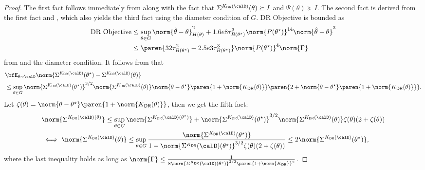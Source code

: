 \begin{proof}
    The first fact follows immediately from  along with the fact that $\Sigma^{K_{\mathsf{DR}}(\calD)}(\theta) \succeq I$ and $\Psi(\theta) \succeq I$. The second fact is derived from the first fact and , which also yields the third fact using the diameter condition of $G$. 
    DR Objective is bounded as
    \begin{align*}
        \textnormal{DR Objective} &\leq \sup_{\theta\in G}\norm{\hat\theta-\theta}_{H(\theta)}^2 + 1.6e8\tau_{B(\theta^\star)}^3\norm{P(\theta^\star)}^{14}\norm{\hat\theta-\theta}^3 \\
        &\leq \paren{32\tau^2_{B(\theta^\star)}+ 2.5e3\tau^3_{B(\theta^\star)}}\norm{P(\theta^\star)}^4 \norm{\Gamma} 
    \end{align*}
    from  and the diameter condition. 
    It follows from  that
    \begin{align*}
        &\bfE_{\theta\sim\calD}\norm{\Sigma^{K_{\mathsf{DR}}(\calD)}(\theta^\star) - \Sigma^{K_{\mathsf{DR}}(\calD)}(\theta)} \\
        &\leq \sup_{\theta\in G}\norm{\Sigma^{K_{\mathsf{DR}}(\calD)}(\theta^\star)}^{3/2}\norm{\Sigma^{K_{\mathsf{DR}}(\calD)}(\theta)}\norm{\theta-\theta^\star}\paren{1+\norm{K_{\mathsf{DR}}(\theta)}}\paren{2+\norm{\theta-\theta^\star}\paren{1+\norm{K_{\mathsf{DR}}(\theta)}}}.
    \end{align*}
    Let $\zeta(\theta) = \norm{\theta-\theta^\star}\paren{1+\norm{K_{\mathsf{DR}}(\theta)}}$, then we get the fifth fact: 
    \begin{align*}
        &\norm{\Sigma^{K_{\mathsf{DR}}(\calD)(\theta)}} 
        \leq \sup_{\theta\in G}\norm{\Sigma^{K_{\mathsf{DR}}(\calD)(\theta^\star)}} + \norm{\Sigma^{K_{\mathsf{DR}}(\calD)}(\theta^\star)}^{3/2}\norm{\Sigma^{K_{\mathsf{DR}}(\calD)}(\theta)}\zeta(\theta)(2+\zeta(\theta)) \\
        &\iff \norm{\Sigma^{K_{\mathsf{DR}}(\calD)}(\theta)} 
        \leq \sup_{\theta\in G}\frac{\norm{\Sigma^{K_{\mathsf{DR}}(\calD)}(\theta^\star)}}{1-\norm{\Sigma^{K_{\mathsf{DR}}}(\calD)(\theta^\star)}^{3/2}\zeta(\theta)(2+\zeta(\theta))} \leq 2\norm{\Sigma^{K_{\mathsf{DR}}(\calD)}(\theta^\star)}, 
    \end{align*}
    where the last inequality holds as long as $\norm{\Gamma}\leq\frac{1}{8\norm{\Sigma^{K_{\mathsf{DR}}}(\calD)(\theta^\star)}^{3/2}\paren{1+\norm{K_{\mathsf{DR}}}}^2}$. 


\end{proof}
